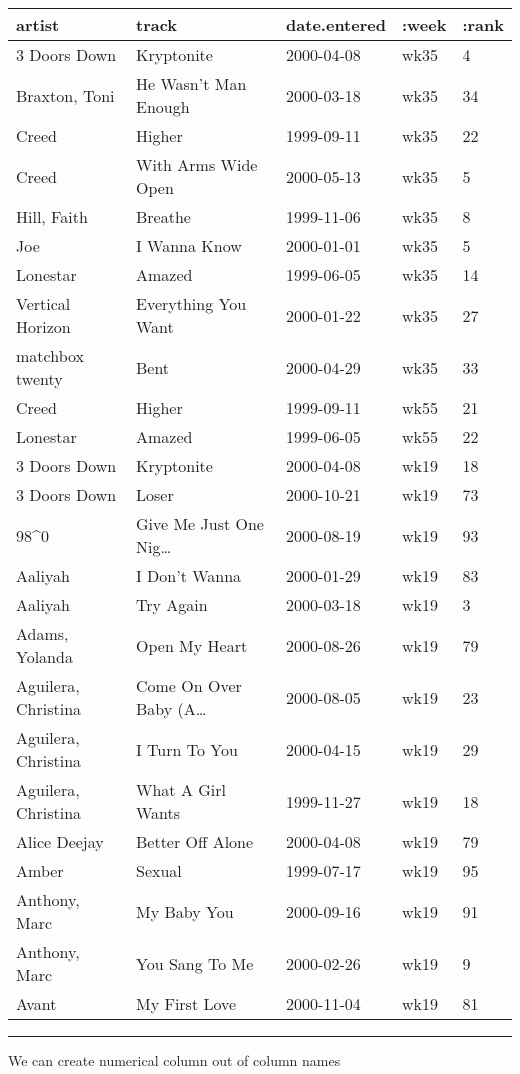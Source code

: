\documentclass[]{article}
\newenvironment{Shaded}{\begin{snugshade}}{\end{snugshade}}
\newcommand{\StringTok}[1]{\textcolor[rgb]{0.31,0.60,0.02}{#1}}
\newcommand{\SpecialStringTok}[1]{\textcolor[rgb]{0.31,0.60,0.02}{#1}}
\newcommand{\VariableTok}[1]{\textcolor[rgb]{0.00,0.00,0.00}{#1}}
\newcommand{\AttributeTok}[1]{\textcolor[rgb]{0.77,0.63,0.00}{#1}}
\newcommand{\NormalTok}[1]{#1}
\begin{document}
\begin{longtable}[]{@{}lllll@{}}
\toprule
artist & track & date.entered & :week & :rank\tabularnewline
\midrule
\endhead
3 Doors Down & Kryptonite & 2000-04-08 & wk35 & 4\tabularnewline
Braxton, Toni & He Wasn't Man Enough & 2000-03-18 & wk35 &
34\tabularnewline
Creed & Higher & 1999-09-11 & wk35 & 22\tabularnewline
Creed & With Arms Wide Open & 2000-05-13 & wk35 & 5\tabularnewline
Hill, Faith & Breathe & 1999-11-06 & wk35 & 8\tabularnewline
Joe & I Wanna Know & 2000-01-01 & wk35 & 5\tabularnewline
Lonestar & Amazed & 1999-06-05 & wk35 & 14\tabularnewline
Vertical Horizon & Everything You Want & 2000-01-22 & wk35 &
27\tabularnewline
matchbox twenty & Bent & 2000-04-29 & wk35 & 33\tabularnewline
Creed & Higher & 1999-09-11 & wk55 & 21\tabularnewline
Lonestar & Amazed & 1999-06-05 & wk55 & 22\tabularnewline
3 Doors Down & Kryptonite & 2000-04-08 & wk19 & 18\tabularnewline
3 Doors Down & Loser & 2000-10-21 & wk19 & 73\tabularnewline
98\^{}0 & Give Me Just One Nig\ldots{} & 2000-08-19 & wk19 &
93\tabularnewline
Aaliyah & I Don't Wanna & 2000-01-29 & wk19 & 83\tabularnewline
Aaliyah & Try Again & 2000-03-18 & wk19 & 3\tabularnewline
Adams, Yolanda & Open My Heart & 2000-08-26 & wk19 & 79\tabularnewline
Aguilera, Christina & Come On Over Baby (A\ldots{} & 2000-08-05 & wk19 &
23\tabularnewline
Aguilera, Christina & I Turn To You & 2000-04-15 & wk19 &
29\tabularnewline
Aguilera, Christina & What A Girl Wants & 1999-11-27 & wk19 &
18\tabularnewline
Alice Deejay & Better Off Alone & 2000-04-08 & wk19 & 79\tabularnewline
Amber & Sexual & 1999-07-17 & wk19 & 95\tabularnewline
Anthony, Marc & My Baby You & 2000-09-16 & wk19 & 91\tabularnewline
Anthony, Marc & You Sang To Me & 2000-02-26 & wk19 & 9\tabularnewline
Avant & My First Love & 2000-11-04 & wk19 & 81\tabularnewline
\bottomrule
\end{longtable}

\begin{center}\rule{0.5\linewidth}{0.5pt}\end{center}

We can create numerical column out of column names

\begin{Shaded}
\end{Shaded}
\end{document}
